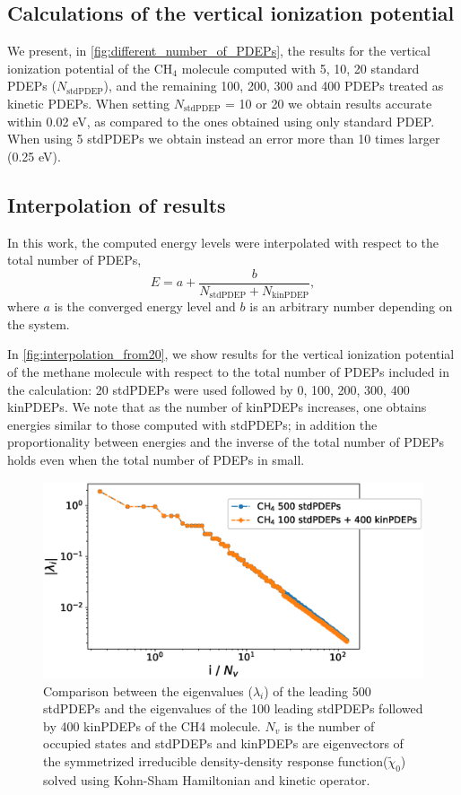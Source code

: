 \documentclass[aip]{revtex4-1}
\begin{document}
\subsection{Calculations of the vertical ionization potential}
We present, in \autoref{fig:different_number_of_PDEPs}, the results for the vertical ionization potential of the $\mathrm{CH_4}$ molecule computed with 5, 10, 20 standard PDEPs ($N_\mathrm{stdPDEP}$), and the remaining 100, 200, 300 and 400 PDEPs treated as kinetic PDEPs. When setting $N_\mathrm{stdPDEP}$ = 10 or 20 we obtain results accurate within 0.02 eV, as compared to the ones obtained using only standard PDEP. When using 5 stdPDEPs we obtain instead an error more than 10 times larger (0.25 eV).

\subsection{Interpolation of results}
In this work, the computed energy levels  were  interpolated with respect to the total number of PDEPs,
\begin{equation}
    E = a + \frac{b}{N_\mathrm{stdPDEP}+N_\mathrm{kinPDEP}},
\end{equation}
where $a$ is the converged energy level and $b$ is an arbitrary number depending on the system.

In \autoref{fig:interpolation_from20}, we show results for the vertical ionization potential  of the methane molecule with respect to the total number of PDEPs included in the calculation: 20 stdPDEPs were used followed by 0, 100, 200, 300, 400 kinPDEPs. We note that as the number of  kinPDEPs increases, one obtains energies similar to those computed with stdPDEPs; in addition the proportionality between energies and the inverse of the total number of PDEPs holds even when the total number of PDEPs in small.


\begin{figure}
    \centering
    \includegraphics[width=0.8\linewidth]{fig/Compare_PDEP_eigenvals_and_mix_eigenvals.eps}
    \caption{Comparison between the eigenvalues ($\lambda_i$) of the leading 500 stdPDEPs and the eigenvalues of the 100 leading stdPDEPs followed by 400 kinPDEPs of the CH4 molecule. $N_v$ is the number of occupied states and stdPDEPs and kinPDEPs are eigenvectors of the symmetrized irreducible density-density response function($\tilde{\chi}_0$) solved using Kohn-Sham Hamiltonian and kinetic operator.}
    \label{fig:compare_eigenvals}
\end{figure}
\end{document}
